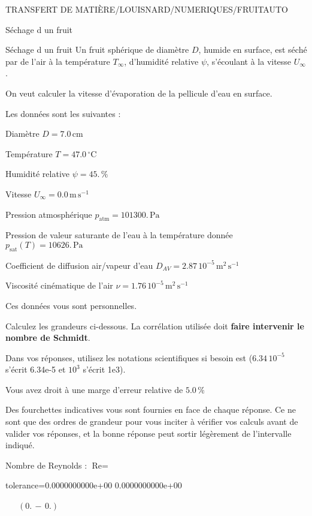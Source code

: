 \documentclass[12pt]{article}
\begin{document}
\begin{quiz}{TRANSFERT DE MATIÈRE/LOUISNARD/NUMERIQUES/FRUITAUTO}
\begin{cloze}{Séchage d un fruit}
\end{cloze} 


 \begin{cloze}{Séchage d un fruit} 
Un fruit sphérique de diamètre $D$, humide en surface, est séché par de l'air à la température $T_\infty$, d'humidité relative $\psi$, s'écoulant à la vitesse $U_\infty$.

On veut calculer la vitesse d'évaporation de la pellicule d'eau en surface.

 

Les données sont les suivantes :

 

Diamètre $D = 7.0\,  \mathrm{cm} $

Température $T = 47.0\,  \mathrm{^\circ\mathrm{C}} $

Humidité relative $\psi = 45.\, \% $

Vitesse $U_\infty = 0.0\,  \mathrm{m}\,  \mathrm{s}^{-1} $

Pression atmosphérique $p_{\text{atm}} = 101300.\,  \mathrm{Pa} $

Pression de valeur saturante de l’eau à la température donnée $p_{\text{sat}}(T) = 10626.\,  \mathrm{Pa} $

Coefficient de diffusion air/vapeur d’eau $D_{AV} =  2.87 \, 10^{-5} \,  \mathrm{m}^{2}\,  \mathrm{s}^{-1} $

Viscosité cinématique de l’air $\nu =  1.76 \, 10^{-5} \,  \mathrm{m}^{2}\,  \mathrm{s}^{-1} $

Ces données vous sont personnelles.

 

Calculez les grandeurs ci-dessous. La corrélation utilisée doit \textbf{faire intervenir le nombre de Schmidt}.

Dans vos réponses, utilisez les notations scientifiques si besoin est ($6.34\, 10^{-5}$ s'écrit 6.34e-5 et $10^{3}$ s'écrit 1e3).

Vous avez droit à une marge d'erreur relative de $5.0\, \% $

Des fourchettes indicatives vous sont fournies en face de chaque réponse. Ce ne sont que des ordres de grandeur pour vous inciter à vérifier vos calculs avant de valider vos réponses, et la bonne réponse peut sortir légèrement de l'intervalle indiqué.

 

Nombre de Reynolds : $\text{Re} =  $
\begin{numerical}[points=1] 
\item[tolerance={0.0000000000e+00}] 0.0000000000e+00 
\end{numerical} 
 $\,$ 
 $ \quad (0. \, - \, 0.) $ 


\end{cloze}
\end{quiz}
\end{document}
